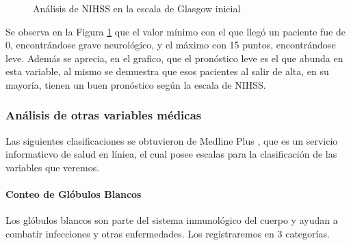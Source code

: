 \begin{center}
    	\begin{figure}[H]
	\centering
	\caption{Análisis de NIHSS en la escala de Glasgow inicial}
	\label{fig:aNISSG}
	\end{figure}
\end{center}
    
    Se observa en la Figura \ref{fig:aNISSG} que el valor mínimo con el que llegó un paciente fue de 0, encontrándose grave neurológico, y el máximo con 15 puntos, encontrándose leve. Además se aprecia, en el grafico, que el pronóstico leve es el que abunda en esta variable, al mismo se demuestra que esos pacientes al salir de alta, en su mayoría, tienen un buen pronóstico según la escala de NIHSS.

    \hypertarget{anuxe1lisis-de-otas-variables-de-muxe9dicas}{%
\subsubsection{Análisis de otras variables médicas}\label{anuxe1lisis-de-otas-variables-de-muxe9dicas}}

Las siguientes clasificaciones se obtuvieron de Medline Plus \cite{med}, que es un servicio informaticvo de salud en líniea, el cual posee escalas para la clasificación de las variables que veremos.

    \hypertarget{conteo-de-gluxf3bulos-blancos}{%
\paragraph{Conteo de Glóbulos
Blancos}\label{conteo-de-gluxf3bulos-blancos}}

Los glóbulos blancos son parte del sistema inmunológico del cuerpo y
ayudan a combatir infecciones y otras enfermedades. Los registraremos en
3 categorías.

